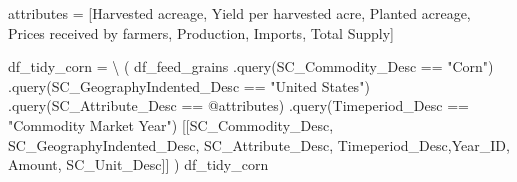 \documentclass[
  letterpaper,
  DIV=11,
  numbers=noendperiod]{scrreprt}
\newenvironment{Shaded}{\begin{snugshade}}{\end{snugshade}}
\newcommand{\NormalTok}[1]{\textcolor[rgb]{0.00,0.23,0.31}{#1}}
\newcommand{\OperatorTok}[1]{\textcolor[rgb]{0.37,0.37,0.37}{#1}}
\newcommand{\StringTok}[1]{\textcolor[rgb]{0.13,0.47,0.30}{#1}}
\begin{document}
\begin{Shaded}
\begin{Highlighting}[]
\NormalTok{attributes }\OperatorTok{=}\NormalTok{ [}\StringTok{\textquotesingle{}Harvested acreage\textquotesingle{}}\NormalTok{, }\StringTok{\textquotesingle{}Yield per harvested acre\textquotesingle{}}\NormalTok{, }\StringTok{\textquotesingle{}Planted acreage\textquotesingle{}}\NormalTok{,}
       \StringTok{\textquotesingle{}Prices received by farmers\textquotesingle{}}\NormalTok{, }\StringTok{\textquotesingle{}Production\textquotesingle{}}\NormalTok{, }\StringTok{\textquotesingle{}Imports\textquotesingle{}}\NormalTok{, }\StringTok{\textquotesingle{}Total Supply\textquotesingle{}}\NormalTok{]}

\NormalTok{df\_tidy\_corn }\OperatorTok{=} \OperatorTok{\textbackslash{}}
\NormalTok{(}
\NormalTok{df\_feed\_grains}
\NormalTok{    .query(}\StringTok{\textquotesingle{}SC\_Commodity\_Desc == "Corn"\textquotesingle{}}\NormalTok{)}
\NormalTok{    .query(}\StringTok{\textquotesingle{}SC\_GeographyIndented\_Desc == "United States"\textquotesingle{}}\NormalTok{)}
\NormalTok{    .query(}\StringTok{\textquotesingle{}SC\_Attribute\_Desc == @attributes\textquotesingle{}}\NormalTok{)}
\NormalTok{    .query(}\StringTok{\textquotesingle{}Timeperiod\_Desc == "Commodity Market Year"\textquotesingle{}}\NormalTok{)}
\NormalTok{    [[}\StringTok{\textquotesingle{}SC\_Commodity\_Desc\textquotesingle{}}\NormalTok{, }\StringTok{\textquotesingle{}SC\_GeographyIndented\_Desc\textquotesingle{}}\NormalTok{, }\StringTok{\textquotesingle{}SC\_Attribute\_Desc\textquotesingle{}}\NormalTok{, }\StringTok{\textquotesingle{}Timeperiod\_Desc\textquotesingle{}}\NormalTok{,}\StringTok{\textquotesingle{}Year\_ID\textquotesingle{}}\NormalTok{, }\StringTok{\textquotesingle{}Amount\textquotesingle{}}\NormalTok{, }\StringTok{\textquotesingle{}SC\_Unit\_Desc\textquotesingle{}}\NormalTok{]]}
\NormalTok{)}
\NormalTok{df\_tidy\_corn}
\end{Highlighting}
\end{Shaded}
\end{document}
